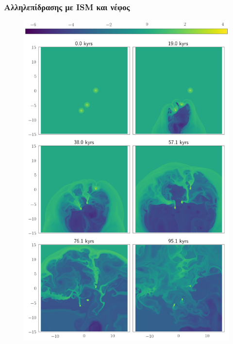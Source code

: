 \subsubsection{Aλληλεπίδρασης με ISM και νέφος}
\begin{figure}[h]
	\centering
	\includegraphics[width=1\linewidth]{DataImages/JetCloudRHO}
	\caption{}
	\label{fig:jetcloudrho}
\end{figure}

